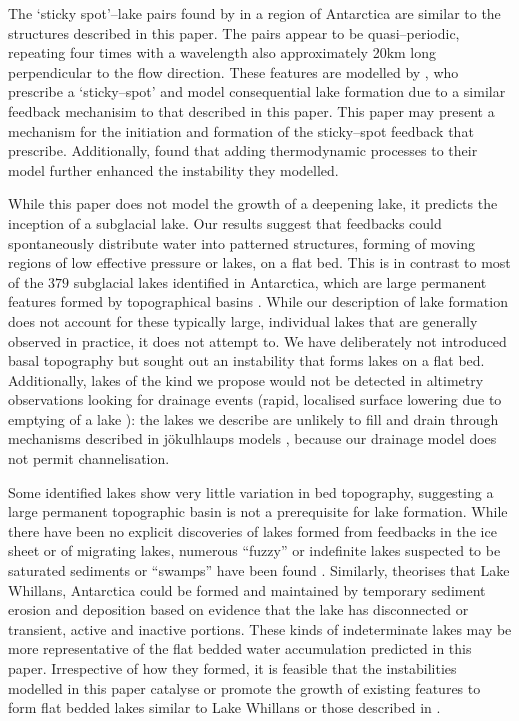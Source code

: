 \documentclass[journal abbreviation, manuscript]{copernicus}
\begin{document}
The `sticky spot'--lake pairs found by \citet{fricker2010synthesizing} in a region of Antarctica are similar to the structures described in this paper. The pairs appear to be quasi--periodic, repeating four times with a wavelength also approximately 20km long perpendicular to the flow direction. These features are modelled by
\citet{sergienko2011sticky}, who prescribe a `sticky--spot' and model consequential lake formation due to a similar feedback mechanisim to that described in this paper. This paper may present a mechanism for the initiation and formation of the sticky--spot feedback that \citet{sergienko2011sticky} prescribe. Additionally, \citet{sergienko2011sticky} found that adding thermodynamic processes to their model further enhanced the instability they modelled.

While this paper does not model the growth of a deepening lake, it predicts the inception of a subglacial lake. Our results suggest that feedbacks could spontaneously distribute water into patterned structures, forming of moving regions of low effective pressure or lakes, on a flat bed. This is in contrast to most of the $379$ subglacial lakes identified in Antarctica, which are large permanent features formed by topographical basins \citep{wright2012fourth}.  While our description of lake formation does not account for these typically large, individual lakes that are generally  observed in practice, it does not attempt to. We have deliberately not introduced basal topography but sought out an instability that forms lakes on a flat bed. Additionally, lakes of the kind we propose would not be detected in altimetry observations looking
for drainage events (rapid, localised surface lowering due to emptying 
of a lake \cite[e.g.][]{siegfried2018thirteen}):
the lakes we describe are unlikely to fill and drain through mechanisms described in j{\"o}kulhlaups models \citep[e.g.][]{nye1976water,evatt2006subglacial}, because our drainage model does not permit channelisation.  

Some identified lakes show very little variation in bed topography, suggesting a large permanent topographic basin is not a prerequisite for lake formation.   While there have been no explicit discoveries of lakes formed from feedbacks in the ice sheet or of migrating lakes, numerous ``fuzzy'' or indefinite lakes suspected to be saturated sediments or ``swamps'' have been found \citep{carter2007radar, young2016distribution}. Similarly, \citet{horgan2012subglacial} theorises that Lake Whillans, Antarctica could be formed and maintained by temporary sediment erosion and deposition based on evidence that the lake has disconnected or transient, active and inactive portions. These kinds of indeterminate lakes may be more representative of the flat bedded water accumulation predicted in this paper. Irrespective of how they formed, it is feasible that the instabilities modelled in this paper catalyse or promote the growth of existing features to form flat bedded lakes similar to Lake Whillans or those described in \citet{fricker2007active}. 
\end{document}
